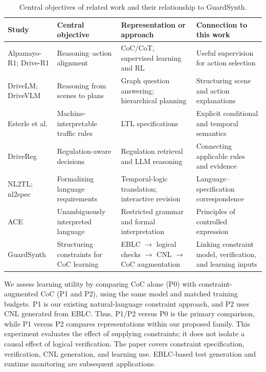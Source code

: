 \documentclass[nolineno]{ieeeaccess}
\begin{document}
\begin{table}[tp]\caption{Central objectives of related work and their relationship to GuardSynth.}
\centering\fontsize{8}{10}\selectfont\setlength{\tabcolsep}{3pt}
\begin{tabular}{@{}>{\raggedright\arraybackslash}p{}>{\raggedright\arraybackslash}p{}>{\raggedright\arraybackslash}p{}>{\raggedright\arraybackslash}p{}@{}}
\toprule
\textbf{Study} & \textbf{Central objective} & \textbf{Representation or approach} & \textbf{Connection to this work}\\
\midrule
Alpamayo-R1; Drive-R1 \cite{r1,r5} & Reasoning--action alignment & CoC/CoT, supervised learning and RL & Useful supervision for action selection\\[3pt]
DriveLM; DriveVLM \cite{r2,r3} & Reasoning from scenes to plans & Graph question answering; hierarchical planning & Structuring scene and action explanations\\[3pt]
Esterle et al. \cite{r6} & Machine-interpretable traffic rules & LTL specifications & Explicit conditional and temporal semantics\\[3pt]
DriveReg \cite{r7} & Regulation-aware decisions & Regulation retrieval and LLM reasoning & Connecting applicable rules and evidence\\[3pt]
NL2TL; nl2spec \cite{r8,r9} & Formalizing language requirements & Temporal-logic translation; interactive revision & Language--specification correspondence\\[3pt]
ACE \cite{r10} & Unambiguously interpreted language & Restricted grammar and formal interpretation & Principles of controlled expression\\[3pt]
GuardSynth & Structuring constraints for CoC learning & EBLC \ensuremath{\rightarrow} logical checks \ensuremath{\rightarrow} CNL \ensuremath{\rightarrow} CoC augmentation & Linking constraint model, verification, and learning inputs\\[3pt]
\bottomrule\end{tabular}
\end{table}

We assess learning utility by comparing CoC alone (P0) with constraint-augmented CoC (P1 and P2), using the same model and matched training budgets. P1 is our existing natural-language constraint approach, and P2 uses CNL generated from EBLC. Thus, P1/P2 versus P0 is the primary comparison, while P1 versus P2 compares representations within our proposed family. This experiment evaluates the effect of supplying constraints; it does not isolate a causal effect of logical verification. The paper covers constraint specification, verification, CNL generation, and learning use. EBLC-based test generation and runtime monitoring are subsequent applications.\par
\end{document}
